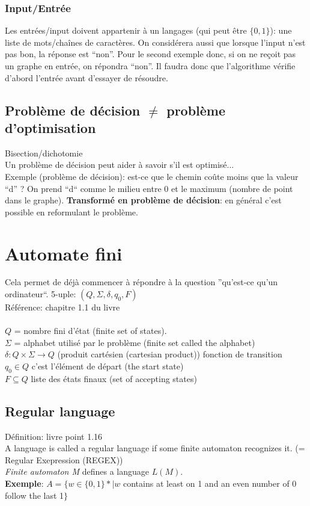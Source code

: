 \documentclass[a4paper,12pt]{article}
\begin{document}
    \subsubsection{Input/Entrée}
      Les entrées/input doivent appartenir à un langages (qui peut être $\{0, 1\}$): une liste de mots/chaînes de caractères.  On considérera aussi que lorsque l'input n'est pas bon, la réponse est ``non''.  Pour le second exemple donc, si on ne reçoit pas un graphe en entrée, on répondra ``non''. Il faudra donc que l'algorithme vérifie d'abord l'entrée avant d'essayer de résoudre.

  \subsection{Problème de décision $\neq$ problème d'optimisation}
    Bisection/dichotomie\\
    Un problème de décision peut aider à savoir s'il est optimisé...\\
    Exemple (problème de décision): est-ce que le chemin coûte moins que la valeur ``d'' ?
    On prend ``d`` comme le milieu entre 0 et le maximum (nombre de point dans le graphe).
    \textbf{Transformé en problème de décision}: en général c'est possible en reformulant le problème.

\section{Automate fini}
  Cela permet de déjà commencer à répondre à la question ''qu'est-ce qu'un ordinateur``.
  5-uple: $(Q, \Sigma, \delta, q_0, F)$\\
  Référence: chapitre 1.1 du livre\\
  \\
  $Q$ = nombre fini d'état (finite set of states).\\
  $\Sigma$ = alphabet utilisé par le problème (finite set called the alphabet)\\
  $\delta : Q \times \Sigma \rightarrow Q$ (produit cartésien (cartesian product)) fonction de transition\\
  $q_0 \in Q$ c'est l'élément de départ (the start state)\\
  $F \subseteq Q$ liste des états finaux (set of accepting states)\\

  \subsection{Regular language}
    Définition: livre point 1.16\\
    A language is called a regular language if some finite automaton recognizes it. (= Regular Exepression (REGEX))\\
    \textit{Finite automaton M} defines a language $L(M)$.\\
    \textbf{Exemple}: $A = \{w \in \{0, 1\}* | w$ contains at least on 1 and an even number of 0 follow the last 1$\}$
\end{document}
